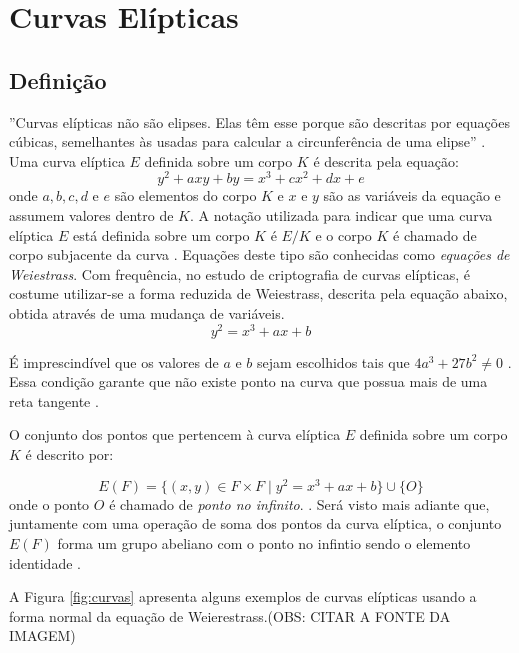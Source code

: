 %
%
\section{Curvas Elípticas}

\subsection{Definição}
''Curvas elípticas não são elipses. Elas têm esse porque são descritas por equações cúbicas, semelhantes às usadas para calcular a circunferência de uma elipse'' \cite{Stallings:2011}. Uma curva elíptica $E$ definida sobre um corpo $K$ é descrita pela equação:
\begin{equation}
y^2 + axy + by = x^3 + cx^2 + dx + e \label{eq:5}
\end{equation}
onde \(a, b, c, d\) e \(e\) são elementos do corpo $K$ e \(x\) e \(y\) são as variáveis da equação e assumem valores dentro de $K$. A notação utilizada para indicar que uma curva elíptica $E$ está definida sobre um corpo $K$ é $E/K$ e o corpo $K$ é chamado de corpo subjacente da curva \cite{Hankerson:2004}. Equações deste tipo são conhecidas como \textit{equações de Weiestrass}. Com frequência, no estudo de criptografia de curvas elípticas, é costume utilizar-se a forma reduzida de Weiestrass, descrita pela equação abaixo, obtida através de uma mudança de variáveis.
\begin{equation}
y^2 = x^3 + ax + b \label{eq:6}
\end{equation}

É imprescindível que os valores de $a$ e $b$ sejam escolhidos tais que $4a^3 + 27b^2 \ne 0$ \cite{Mandy:2007}. Essa condição garante que não existe ponto na curva que possua mais de uma reta tangente \cite{Hankerson:2004}.

O conjunto dos pontos que pertencem à curva elíptica $E$ definida sobre um corpo $K$ é descrito por:

$$ E(F) = \{(x,y) \in F \times F \mid y^2 = x^3 + ax + b\} \cup \{O\} $$
onde o ponto ${O}$ é chamado de \textit{ponto no infinito}. \cite{Mandy:2007}.
Será visto mais adiante que, juntamente com uma operação de soma dos pontos da curva elíptica, o conjunto $E(F)$ forma um grupo abeliano com o ponto no infintio sendo o elemento identidade \cite{Hankerson:2004}.

A Figura \ref{fig:curvas} apresenta alguns exemplos de curvas elípticas usando a forma normal da equação de Weierestrass.(OBS: CITAR A FONTE DA IMAGEM)

